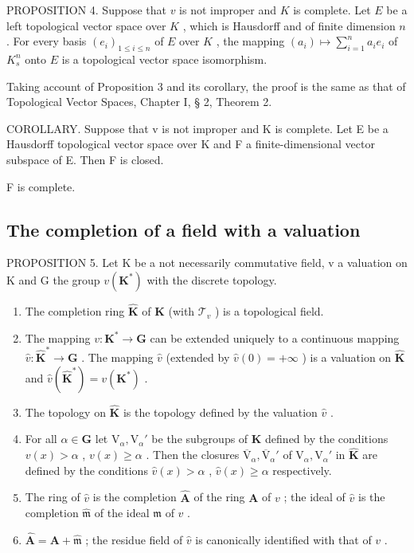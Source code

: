 PROPOSITION 4. Suppose that \(v\) is not improper and \(K\) is complete. Let \(E\) be a left topological vector space over \(K\) , which is Hausdorff and of finite dimension \(n\) . For every basis \((e_i)_{1 \leqslant i \leqslant n}\) of \(E\) over \(K\) , the mapping \((a_i) \mapsto \sum_{i=1}^{n} a_i e_i\) of \(K_s^n\) onto \(E\) is a topological vector space isomorphism.

Taking account of Proposition 3 and its corollary, the proof is the same as that of Topological Vector Spaces, Chapter I, § 2, Theorem 2.

COROLLARY. Suppose that v is not improper and K is complete. Let E be a Hausdorff topological vector space over K and F a finite-dimensional vector subspace of E. Then F is closed.

F is complete.

\subsection{The completion of a field with a valuation}

PROPOSITION 5. Let K be a not necessarily commutative field, v a valuation on K and G the group \(v(\mathbf{K}^{*})\) with the discrete topology.

\begin{enumerate}
\def\labelenumi{(\alph{enumi})}
\item
  The completion ring \(\hat{\mathbf{K}}\) of \(\mathbf{K}\) (with \(\mathcal{T}_v\) ) is a topological field.
\item
  The mapping \(v: \mathbf{K}^* \to \mathbf{G}\) can be extended uniquely to a continuous mapping \(\hat{v}: \hat{\mathbf{K}}^* \to \mathbf{G}\) . The mapping \(\hat{v}\) (extended by \(\hat{v}(0) = +\infty\) ) is a valuation on \(\hat{\mathbf{K}}\) and \(\hat{v}(\hat{\mathbf{K}}^*) = v(\mathbf{K}^*)\) .
\item
  The topology on \(\hat{\mathbf{K}}\) is the topology defined by the valuation \(\hat{v}\) .
\item
  For all \(\alpha \in \mathbf{G}\) let \(\mathrm{V}_{\alpha}, \mathrm{V}_{\alpha}'\) be the subgroups of \(\mathbf{K}\) defined by the conditions \(v(x) > \alpha\) , \(v(x) \geqslant \alpha\) . Then the closures \(\overline{\mathrm{V}}_{\alpha}, \overline{\mathrm{V}}_{\alpha}'\) of \(\mathrm{V}_{\alpha}, \mathrm{V}_{\alpha}'\) in \(\hat{\mathbf{K}}\) are defined by the conditions \(\hat{v}(x) > \alpha\) , \(\hat{v}(x) \geqslant \alpha\) respectively.
\item
  The ring of \(\hat{v}\) is the completion \(\hat{\mathbf{A}}\) of the ring \(\mathbf{A}\) of \(v\) ; the ideal of \(\hat{v}\) is the completion \(\hat{\mathfrak{m}}\) of the ideal \(\mathfrak{m}\) of \(v\) .
\item
  \(\hat{\mathbf{A}} = \mathbf{A} + \hat{\mathfrak{m}}\) ; the residue field of \(\hat{v}\) is canonically identified with that of \(v\) .
\end{enumerate}

